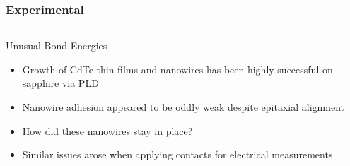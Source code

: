 \documentclass[]{beamer}%
\begin{document}
\begin{frame}
    \frametitle{Experimental}
    \begin{columns}
        \begin{column}{0.5\textwidth}
            \begin{block}{Unusual Bond Energies}
                \begin{itemize}[<+-| alert@+>]
                    \item Growth of CdTe thin films and nanowires has been highly successful on sapphire via PLD
                    \item Nanowire adhesion appeared to be oddly weak despite epitaxial alignment
                    \item How did these nanowires stay in place?
                    \item Similar issues arose when applying contacts for electrical measurements
                \end{itemize}
            \end{block}
        \end{column}
        \begin{column}{0.5\textwidth}
            \centering
             \\

\end{column}
\end{columns}
\end{frame}
\end{document}
